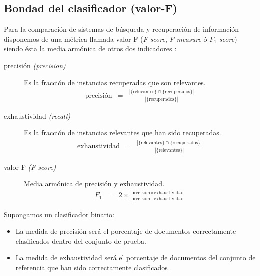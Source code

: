 \subsection{Bondad del clasificador (valor-F)}

Para la comparación de sistemas de búsqueda y recuperación de información disponemos de una métrica llamada valor-F (\emph{F-score}, \emph{F-measure} ó \emph{$F_1$ score}) siendo ésta la media armónica de otros dos indicadores \citep[Precisión y exhaustividad]{wikipedia-es}:
\begin{description}
\item[precisión \emph{(precision)}] 
Es la fracción de instancias recuperadas que son relevantes.
\begin{eqnarray}
\text{precisión} &=& \frac{|\{\text{relevantes}\}\cap\{\text{recuperados}\}|}{|\{\text{recuperados}\}|}
\end{eqnarray}
\item[exhaustividad \emph{(recall)}] 
Es la fracción de instancias relevantes que han sido recuperadas.
\begin{eqnarray}
\text{exhaustividad} &=& \frac{|\{\text{relevantes}\}\cap\{\text{recuperados}\}|}{|\{\text{relevantes}\}|}
\end{eqnarray}
\item[valor-F \emph{(F-score)}] Media armónica de precisión y exhaustividad.
\begin{eqnarray}
F_1 &=& 2\times\frac{\text{precisión}\times\text{exhaustividad}}{\text{precisión}+\text{exhaustividad}}
\end{eqnarray}
\end{description}

Supongamos un clasificador binario:
\begin{itemize}
\item La medida de precisión será el porcentaje de documentos correctamente clasificados dentro del conjunto de prueba.
\item La medida de exhaustividad será el porcentaje de documentos del conjunto de referencia que han sido correctamente clasificados \citep{Perkins2010}.
\end{itemize}
